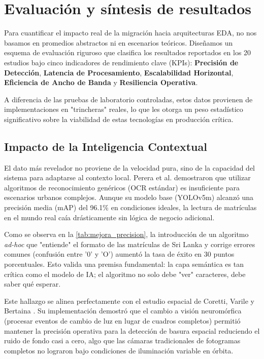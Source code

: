 \section{Evaluación y síntesis de resultados}

Para cuantificar el impacto real de la migración hacia arquitecturas EDA, no nos basamos en promedios abstractos ni en escenarios teóricos. Diseñamos un esquema de evaluación riguroso que clasifica los resultados reportados en los 20 estudios bajo cinco indicadores de rendimiento clave (KPIs): \textbf{Precisión de Detección}, \textbf{Latencia de Procesamiento}, \textbf{Escalabilidad Horizontal}, \textbf{Eficiencia de Ancho de Banda} y \textbf{Resiliencia Operativa}.

A diferencia de las pruebas de laboratorio controladas, estos datos provienen de implementaciones en "trincheras" reales, lo que les otorga un peso estadístico significativo sobre la viabilidad de estas tecnologías en producción crítica.

\subsection{Impacto de la Inteligencia Contextual}
El dato más revelador no proviene de la velocidad pura, sino de la capacidad del sistema para adaptarse al contexto local. Perera et al. \cite{perera2024traffic} demostraron que utilizar algoritmos de reconocimiento genéricos (OCR estándar) es insuficiente para escenarios urbanos complejos. Aunque su modelo base (YOLOv5m) alcanzó una precisión media (mAP) del 96.1\% en condiciones ideales, la lectura de matrículas en el mundo real caía drásticamente sin lógica de negocio adicional.

Como se observa en la \cref{tab:mejora_precision}, la introducción de un algoritmo \textit{ad-hoc} que "entiende" el formato de las matrículas de Sri Lanka y corrige errores comunes (confusión entre '0' y 'O') aumentó la tasa de éxito en 30 puntos porcentuales. Esto valida una premisa fundamental: la capa semántica es tan crítica como el modelo de IA; el algoritmo no solo debe "ver" caracteres, debe saber qué esperar.



Este hallazgo se alinea perfectamente con el estudio espacial de Coretti, Varile y Bertaina \cite{coretti2025neuromorphic}. Su implementación demostró que el cambio a visión neuromórfica (procesar eventos de cambio de luz en lugar de cuadros completos) permitió mantener la precisión operativa para la detección de basura espacial reduciendo el ruido de fondo casi a cero, algo que las cámaras tradicionales de fotogramas completos no lograron bajo condiciones de iluminación variable en órbita.

